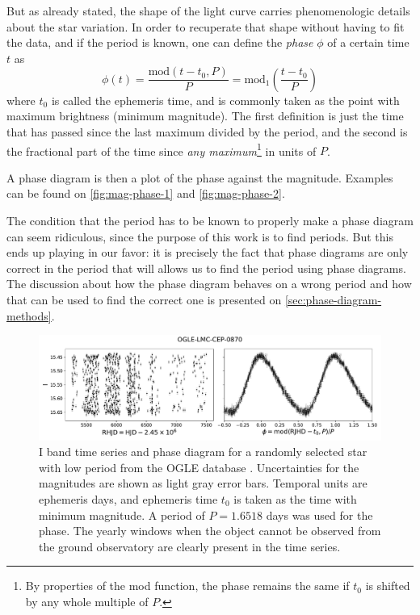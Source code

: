	But as already stated, the shape of the light curve carries phenomenologic details about the star variation.
	In order to recuperate that shape without having to fit the data, and if the period is known,
	one can define the \textit{phase} $\phi$ of a certain time $t$ as
	\begin{equation}
		\phi(t) = \frac{\text{mod}(t-t_0,P)}{P} = \text{mod}_1\left(\frac{t-t_0}{P}\right) \label{eq:phase}
	\end{equation}
	where $t_0$ is called the ephemeris time, and is commonly taken as the point with maximum brightness (minimum magnitude).
	The first definition is just the time that has passed since the last maximum divided by the period, 
	and the second is the fractional part of the time since \textit{any maximum}\footnote{
		By properties of the mod function, the phase remains the same if $t_0$ is shifted by any whole multiple of $P$.
	} in units of $P$.
	
	A phase diagram is then a plot of the phase against the magnitude. 
	Examples can be found on \autoref{fig:mag-phase-1} and \autoref{fig:mag-phase-2}.
	
	The condition that the period has to be known to properly make a phase diagram can seem ridiculous, 
	since the purpose of this work is to find periods.
	But this ends up playing in our favor: 
	it is precisely the fact that phase diagrams are only correct in the period that will allows us to find the period using phase diagrams.
	The discussion about how the phase diagram behaves on a wrong period and how that can be used to find the correct one is presented on \autoref{sec:phase-diagram-methods}.
	
	\begin{figure}
		\centering
		\includegraphics[width=\textwidth]{img/mag_phase_LMC_0870.pdf}
		\caption[Light curve of OGLE-LMC-CEP-0870]{
			I band time series and phase diagram for a randomly selected star with low period from the OGLE database \citep{OGLE2016}.
			Uncertainties for the magnitudes are shown as light gray error bars.
			Temporal units are ephemeris days, and ephemeris time $t_0$ is taken as the time with minimum magnitude.
			A period of $P=1.6518$ days was used for the phase.
			The yearly windows when the object cannot be observed from the ground observatory are clearly present in the time series.
		} 
		\label{fig:mag-phase-1}
	\end{figure}
	
